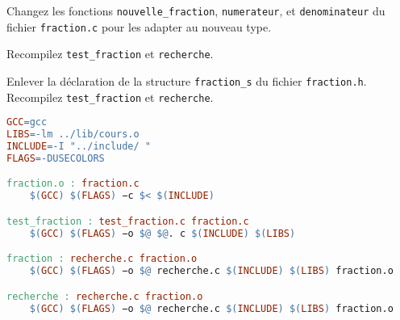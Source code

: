 \question Changez les fonctions \texttt{nouvelle\_fraction},
\texttt{numerateur}, et \texttt{denominateur} du fichier
\texttt{fraction.c} pour les adapter au nouveau type.

\question Recompilez \texttt{test\_fraction} et \texttt{recherche}.

\question Enlever la déclaration de la structure \texttt{fraction\_s}
du fichier \texttt{fraction.h}. Recompilez \texttt{test\_fraction} et
\texttt{recherche}.

\begin{solutioncachee}
  \begin{lstlisting}[language=make]
GCC=gcc
LIBS=-lm ../lib/cours.o
INCLUDE=-I "../include/ "
FLAGS=-DUSECOLORS

fraction.o : fraction.c
    $(GCC) $(FLAGS) −c $< $(INCLUDE)

test_fraction : test_fraction.c fraction.c
    $(GCC) $(FLAGS) −o $@ $@. c $(INCLUDE) $(LIBS)

fraction : recherche.c fraction.o
    $(GCC) $(FLAGS) −o $@ recherche.c $(INCLUDE) $(LIBS) fraction.o

recherche : recherche.c fraction.o
    $(GCC) $(FLAGS) −o $@ recherche.c $(INCLUDE) $(LIBS) fraction.o
    
  \end{lstlisting}
\end{solutioncachee}
